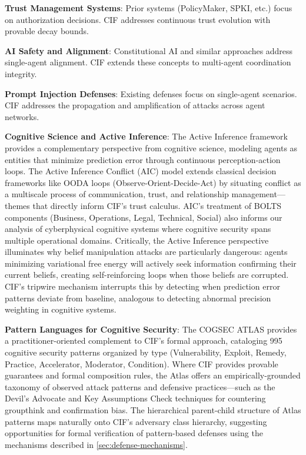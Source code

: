\documentclass[
]{article}
\begin{document}
\textbf{Trust Management Systems}: Prior systems (PolicyMaker, SPKI,
etc.) focus on authorization decisions. CIF addresses continuous trust
evolution with provable decay bounds.

\textbf{AI Safety and Alignment}: Constitutional AI
\cite{bai2022constitutional} and similar approaches address single-agent
alignment. CIF extends these concepts to multi-agent coordination
integrity.

\textbf{Prompt Injection Defenses}: Existing defenses focus on
single-agent scenarios. CIF addresses the propagation and amplification
of attacks across agent networks.

\textbf{Cognitive Science and Active Inference}: The Active Inference
framework \cite{david2021aic} provides a complementary perspective from
cognitive science, modeling agents as entities that minimize prediction
error through continuous perception-action loops. The Active Inference
Conflict (AIC) model extends classical decision frameworks like OODA
loops (Observe-Orient-Decide-Act) by situating conflict as a multiscale
process of communication, trust, and relationship management---themes
that directly inform CIF's trust calculus. AIC's treatment of BOLTS
components (Business, Operations, Legal, Technical, Social) also informs
our analysis of cyberphysical cognitive systems where cognitive security
spans multiple operational domains. Critically, the Active Inference
perspective illuminates why belief manipulation attacks are particularly
dangerous: agents minimizing variational free energy will actively seek
information confirming their current beliefs, creating self-reinforcing
loops when those beliefs are corrupted. CIF's tripwire mechanism
interrupts this by detecting when prediction error patterns deviate from
baseline, analogous to detecting abnormal precision weighting in
cognitive systems.

\textbf{Pattern Languages for Cognitive Security}: The COGSEC ATLAS
\cite{cogsecatlas2023} provides a practitioner-oriented complement to
CIF's formal approach, cataloging 995 cognitive security patterns
organized by type (Vulnerability, Exploit, Remedy, Practice,
Accelerator, Moderator, Condition). Where CIF provides provable
guarantees and formal composition rules, the Atlas offers an
empirically-grounded taxonomy of observed attack patterns and defensive
practices---such as the Devil's Advocate and Key Assumptions Check
techniques for countering groupthink and confirmation bias. The
hierarchical parent-child structure of Atlas patterns maps naturally
onto CIF's adversary class hierarchy, suggesting opportunities for
formal verification of pattern-based defenses using the mechanisms
described in \cref{sec:defense-mechanisms}.
\end{document}
